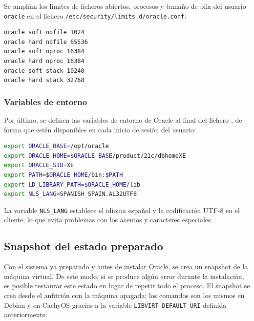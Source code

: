 Se amplían los límites de ficheros abiertos, procesos y tamaño de pila del usuario \texttt{oracle} en el fichero \texttt{/etc/security/limits.d/oracle.conf}:

\begin{lstlisting}
oracle soft nofile 1024
oracle hard nofile 65536
oracle soft nproc 16384
oracle hard nproc 16384
oracle soft stack 10240
oracle hard stack 32768
\end{lstlisting}


\subsubsection{Variables de entorno}

Por último, se definen las variables de entorno de Oracle al final del fichero , de forma que estén disponibles en cada inicio de sesión del usuario:

\begin{lstlisting}[language=bash]
export ORACLE_BASE=/opt/oracle
export ORACLE_HOME=$ORACLE_BASE/product/21c/dbhomeXE
export ORACLE_SID=XE
export PATH=$ORACLE_HOME/bin:$PATH
export LD_LIBRARY_PATH=$ORACLE_HOME/lib
export NLS_LANG=SPANISH_SPAIN.AL32UTF8
\end{lstlisting}

La variable \texttt{NLS\_LANG} establece el idioma español y la codificación UTF-8 en el cliente, lo que evita problemas con los acentos y caracteres especiales.


\subsection{Snapshot del estado preparado}

Con el sistema ya preparado y antes de instalar Oracle, se crea un snapshot de la máquina virtual. De este modo, si se produce algún error durante la instalación, es posible restaurar este estado en lugar de repetir todo el proceso. El snapshot se crea desde el anfitrión con la máquina apagada; los comandos son los mismos en Debian y en CachyOS gracias a la variable \texttt{LIBVIRT\_DEFAULT\_URI} definida anteriormente:

